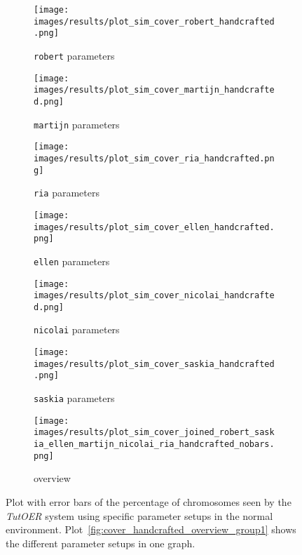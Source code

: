 \begin{figure}[ht]
	\begin{subfigure}{0.48\linewidth}
	\texttt{[image: images/results/plot\_sim\_cover\_robert\_handcrafted.png]}
	\caption{\texttt{robert} parameters}
	\label{fig:cover_handcrafted_robert}
	\end{subfigure}
	\hfill
	\begin{subfigure}{0.48\linewidth}
	\texttt{[image: images/results/plot\_sim\_cover\_martijn\_handcrafted.png]}
	\caption{\texttt{martijn} parameters}
	\label{fig:cover_handcrafted_martijn}
	\end{subfigure}
	\begin{subfigure}{0.48\linewidth}
	\texttt{[image: images/results/plot\_sim\_cover\_ria\_handcrafted.png]}
	\caption{\texttt{ria} parameters}
	\label{fig:cover_handcrafted_ria}
	\end{subfigure}
	\hfill
	\begin{subfigure}{0.48\linewidth}
	\texttt{[image: images/results/plot\_sim\_cover\_ellen\_handcrafted.png]}
	\caption{\texttt{ellen} parameters}
	\label{fig:cover_handcrafted_ellen}
	\end{subfigure}
	\begin{subfigure}{0.48\linewidth}
	\texttt{[image: images/results/plot\_sim\_cover\_nicolai\_handcrafted.png]}
	\caption{\texttt{nicolai} parameters}
	\label{fig:cover_handcrafted_nicolai}
	\end{subfigure}
	\hfill
	\begin{subfigure}{0.48\linewidth}
	\texttt{[image: images/results/plot\_sim\_cover\_saskia\_handcrafted.png]}
	\caption{\texttt{saskia} parameters}
	\label{fig:cover_handcrafted_saskia}
	\end{subfigure}
	\begin{subfigure}{\linewidth}
	\texttt{[image: images/results/plot\_sim\_cover\_joined\_robert\_saskia\_ellen\_martijn\_nicolai\_ria\_handcrafted\_nobars.png]}
	\caption{overview}
	\label{fig:cover_handcrafted_overview_group2}
	\end{subfigure}
	\caption[Percentage chromosomes seen in normal simulated environment for
	group 1]{Plot with error bars of the percentage of chromosomes seen by the \emph{TutOER}
	system using specific parameter setups in the normal environment.
	Plot~\ref{fig:cover_handcrafted_overview_group1} shows the
	different parameter setups in one graph.}
	\label{fig:cover_handcrafted_container_group2}
\end{figure}

